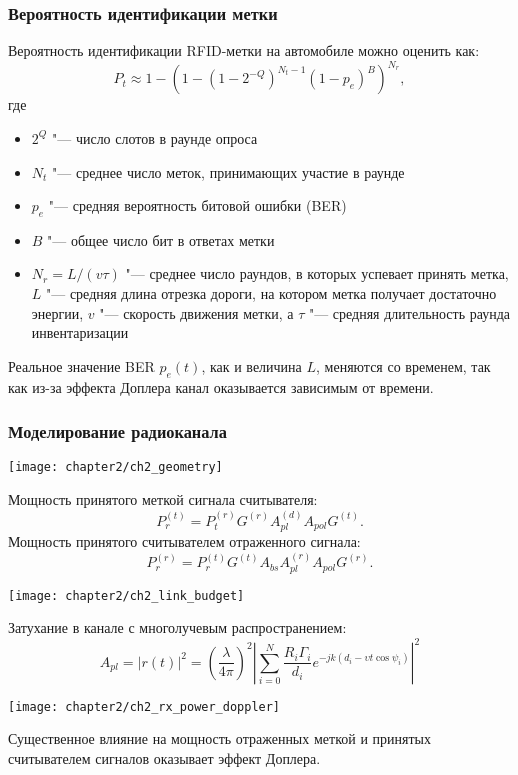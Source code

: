 \begin{frame}
    \frametitle{Вероятность идентификации метки}
    Вероятность идентификации RFID-метки на автомобиле можно оценить как:
    \[
        P_t \approx 1 - \left( 1 - (1 - 2^{-Q})^{N_t-1} (1 - p_e)^B \right)^{N_r},
    \]
    где
    \begin{itemize}
        \item $2^Q$ "--- число слотов в раунде опроса
        \item $N_t$ "--- среднее число меток, принимающих участие в раунде
        \item $p_e$ "--- средняя вероятность битовой ошибки (BER)
        \item $B$ "--- общее число бит в ответах метки
        \item $N_r = L / (v \tau)$ "--- среднее число раундов, в которых успевает принять метка, $L$ "--- средняя длина отрезка дороги, на котором метка получает достаточно энергии, $v$ "--- скорость движения метки, а $\tau$ "--- средняя длительность раунда инвентаризации
    \end{itemize}
    Реальное значение BER $p_e(t)$, как и величина $L$, меняются со временем, так как из-за эффекта Доплера канал оказывается зависимым от времени.
\end{frame}


\begin{frame}[allowframebreaks]
    \frametitle{Моделирование радиоканала}
    \vfill
    \begin{center}
        \texttt{[image: chapter2/ch2\_geometry]}
    \end{center}
    Мощность принятого меткой сигнала считывателя:
    $$
        P_r^{(t)} = P_t^{(r)} G^{(r)} A_{pl}^{(d)} A_{pol} G^{(t)}.
    $$
    Мощность принятого считывателем отраженного сигнала:
    $$
        P_r^{(r)} = P_r^{(t)} G^{(t)} A_{bs} A_{pl}^{(r)} A_{pol} G^{(r)}.
    $$
    \vfill
    \framebreak
    \vfill
    \begin{center}
        \texttt{[image: chapter2/ch2\_link\_budget]}
    \end{center}
    Затухание в канале с многолучевым распространением:
    $$
        A_{pl} = |r(t)|^2 = \left(\frac{\lambda}{4\pi}\right)^2
            \left|\sum\limits_{i=0}^{N} \frac{R_i\Gamma_i}{d_i}
            e^{-jk(d_i-\upsilon t \cos{\psi_i})}\right|^2
    $$
    \vfill
    \framebreak
    \vfill
    \begin{center}
        \texttt{[image: chapter2/ch2\_rx\_power\_doppler]}
    \end{center}
    Существенное влияние на мощность отраженных меткой и принятых считывателем сигналов оказывает эффект Доплера.
    \vfill
  \end{frame}

